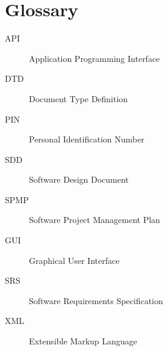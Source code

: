 \documentclass[titlepage]{article}
\begin{document}
\section{Glossary}
\begin{description}
\item[API] Application Programming Interface
\item[DTD] Document Type Definition
\item[PIN] Personal Identification Number
\item[SDD] Software Design Document
\item[SPMP] Software Project Management Plan
\item[GUI] Graphical User Interface
\item[SRS] Software Requirements Specification
\item[XML] Extensible Markup Language
\end{description}
\end{document}
